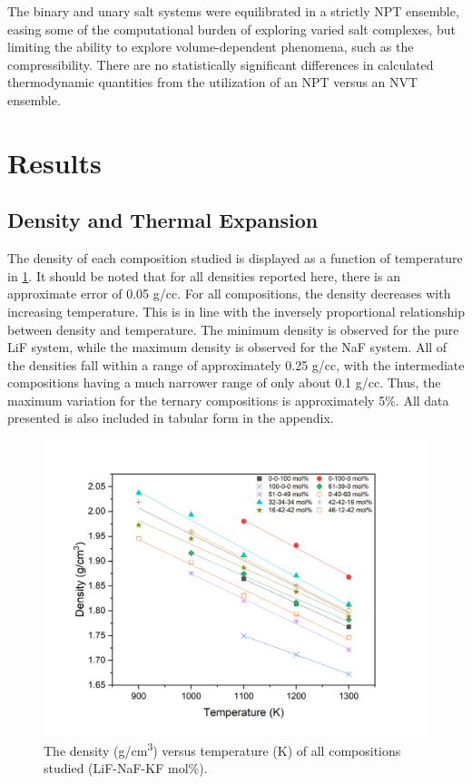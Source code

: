 \documentclass[preprint,12pt]{elsarticle}
\begin{document}
The binary and unary salt systems were equilibrated in a strictly NPT ensemble, easing some of the computational burden of exploring varied salt complexes, but limiting the ability to explore volume-dependent phenomena, such as the compressibility. There are no statistically significant differences in calculated thermodynamic quantities from the utilization of an NPT versus an NVT ensemble. 

\section{Results}

\subsection{Density and Thermal Expansion}

The density of each composition studied is displayed as a function of temperature in \cref{fig:densityVsTemp}. It should be noted that for all densities reported here, there is an approximate error of 0.05 g/cc. For all compositions, the density decreases with increasing temperature. This is in line with the inversely proportional relationship between density and temperature. The minimum density is observed for the pure LiF system, while the maximum density is observed for the NaF system. All of the densities fall within a range of approximately 0.25 g/cc, with the intermediate compositions having a much narrower range of only about 0.1 g/cc. Thus, the maximum variation for the ternary compositions is approximately 5\%. All data presented is also included in tabular form in the appendix. 

\begin{figure}[!h]
\centering
\includegraphics[width=.65\textwidth]{DensityVTemp_2.jpg}
\caption{The density (g/cm\textsuperscript{3}) versus temperature (K) of all compositions studied (LiF-NaF-KF mol\%).}
\label{fig:densityVsTemp}
\end{figure}
\end{document}
